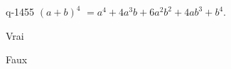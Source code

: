 \begin{truefalse}{q-1455}
$(a+b)^4$ $=a^4+4a^3b+6a^2b^2+4ab^3+b^4$.
\item* Vrai
\item Faux
\end{truefalse}

